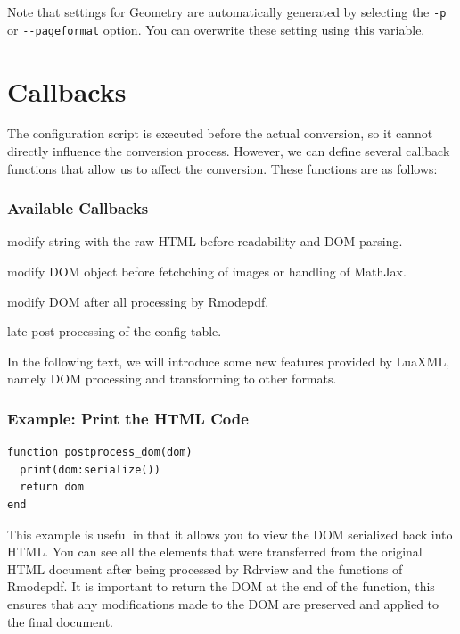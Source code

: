 Note that settings for Geometry are automatically generated by selecting the
\verb|-p| or \verb|--pageformat| option. You can overwrite these setting using 
this variable.

\section{Callbacks}

The configuration script is executed before the actual conversion, so it cannot
directly influence the conversion process. However, we can define several
callback functions that allow us to affect the conversion. These functions are
as follows:

\begin{frame}[fragile]
  \frametitle{Available Callbacks}
  \begin{description}
  \item[\texttt{preprocess\_content}] modify string with the raw HTML before
    readability and DOM parsing.
  \item[\texttt{preprocess\_dom}] modify DOM object before fetchching of images
    or handling of MathJax.
  \item[\texttt{postprocess\_dom}] modify DOM after all processing by Rmodepdf.
  \item[\texttt{postprocess}] late post-processing of the config table.
\end{description}

\end{frame}

In the following text, we will introduce some new features provided by LuaXML, 
namely DOM processing and transforming to other formats.

\begin{frame}[fragile]
  \frametitle{Example: Print the HTML Code}


\begin{verbatim}
function postprocess_dom(dom)
  print(dom:serialize())
  return dom
end
\end{verbatim}
\end{frame}

This example is useful in that it allows you to view the DOM serialized back
into HTML. You can see all the elements that were transferred from the original
HTML document after being processed by Rdrview and the functions of Rmodepdf.
It is important to return the DOM at the end of the function, this ensures that
any modifications made to the DOM are preserved and applied to the final
document.

